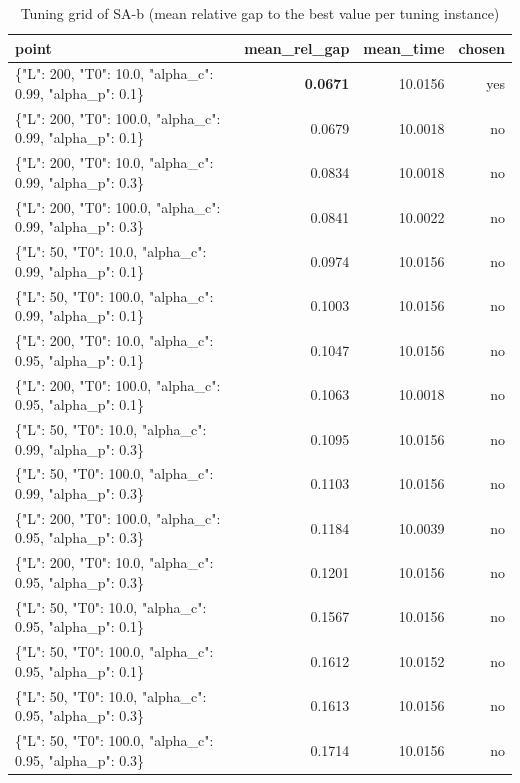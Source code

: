 \begin{table}[htbp]
\centering
\small
\caption{Tuning grid of SA-b (mean relative gap to the best value per tuning instance)}
\label{tab:E8b_tuning_budget_SA-b}
\begin{tabular}{lrrr}
\toprule
point & mean\_rel\_gap & mean\_time & chosen \\
\midrule
\{"L": 200, "T0": 10.0, "alpha\_c": 0.99, "alpha\_p": 0.1\} & \textbf{0.0671} & 10.0156 & yes \\
\{"L": 200, "T0": 100.0, "alpha\_c": 0.99, "alpha\_p": 0.1\} & 0.0679 & 10.0018 & no \\
\{"L": 200, "T0": 10.0, "alpha\_c": 0.99, "alpha\_p": 0.3\} & 0.0834 & 10.0018 & no \\
\{"L": 200, "T0": 100.0, "alpha\_c": 0.99, "alpha\_p": 0.3\} & 0.0841 & 10.0022 & no \\
\{"L": 50, "T0": 10.0, "alpha\_c": 0.99, "alpha\_p": 0.1\} & 0.0974 & 10.0156 & no \\
\{"L": 50, "T0": 100.0, "alpha\_c": 0.99, "alpha\_p": 0.1\} & 0.1003 & 10.0156 & no \\
\{"L": 200, "T0": 10.0, "alpha\_c": 0.95, "alpha\_p": 0.1\} & 0.1047 & 10.0156 & no \\
\{"L": 200, "T0": 100.0, "alpha\_c": 0.95, "alpha\_p": 0.1\} & 0.1063 & 10.0018 & no \\
\{"L": 50, "T0": 10.0, "alpha\_c": 0.99, "alpha\_p": 0.3\} & 0.1095 & 10.0156 & no \\
\{"L": 50, "T0": 100.0, "alpha\_c": 0.99, "alpha\_p": 0.3\} & 0.1103 & 10.0156 & no \\
\{"L": 200, "T0": 100.0, "alpha\_c": 0.95, "alpha\_p": 0.3\} & 0.1184 & 10.0039 & no \\
\{"L": 200, "T0": 10.0, "alpha\_c": 0.95, "alpha\_p": 0.3\} & 0.1201 & 10.0156 & no \\
\{"L": 50, "T0": 10.0, "alpha\_c": 0.95, "alpha\_p": 0.1\} & 0.1567 & 10.0156 & no \\
\{"L": 50, "T0": 100.0, "alpha\_c": 0.95, "alpha\_p": 0.1\} & 0.1612 & 10.0152 & no \\
\{"L": 50, "T0": 10.0, "alpha\_c": 0.95, "alpha\_p": 0.3\} & 0.1613 & 10.0156 & no \\
\{"L": 50, "T0": 100.0, "alpha\_c": 0.95, "alpha\_p": 0.3\} & 0.1714 & 10.0156 & no \\
\bottomrule
\end{tabular}
\end{table}
